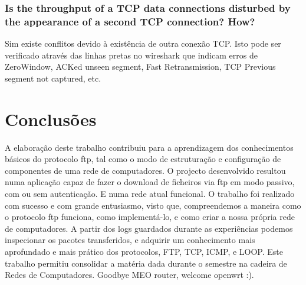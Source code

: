 \documentclass[a4paper]{article}
\begin{document}
\subsubsection{Is the throughput of a TCP data connections disturbed by the appearance of a second TCP connection? How?}
Sim existe conflitos devido à existência de outra conexão TCP. Isto pode ser verificado através das linhas pretas no wireshark que indicam erros de ZeroWindow, ACKed unseen segment, Fast Retransmission, TCP Previous segment not captured, etc.

\section{Conclusões}
A elaboração deste trabalho contribuiu para a aprendizagem dos conhecimentos
básicos do protocolo ftp, tal como o modo de estruturação e configuração de
componentes de uma rede de computadores. O projecto  desenvolvido resultou numa
aplicação capaz de fazer o download de ficheiros via ftp em modo passivo, com
ou sem autenticação. E numa rede atual funcional. O trabalho foi realizado com
sucesso e com grande entusiasmo, visto que, compreendemos a maneira como o
protocolo ftp funciona, como implementá-lo, e como criar a nossa própria rede de
computadores. A partir dos logs guardados durante as experiências podemos inspecionar
os pacotes transferidos, e adquirir um conhecimento mais aprofundado e mais prático dos protocolos,
FTP, TCP, ICMP, e LOOP. Este trabalho permitiu consolidar a matéria dada durante o semestre na cadeira
de Redes de Computadores. Goodbye MEO router, welcome openwrt :).
\end{document}
